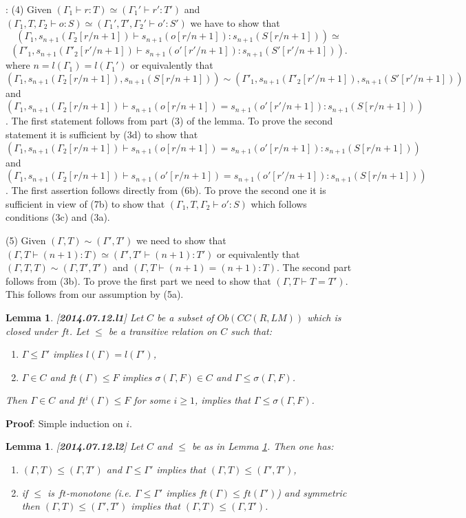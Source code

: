 \documentclass[11pt]{article}
\newenvironment{proof}{{\bf Proof}:}{\vskip 5mm }
\newtheorem{lemma}[proposition]{Lemma}
\newcommand{\llabel}[1]{\label{#1}[{\bf #1}]}
\begin{document}
\begin{proof}
(4) Given $(\Gamma_1\vdash r:T)\simeq(\Gamma_1'\vdash r':T')$ and $(\Gamma_1,T,\Gamma_2\vdash o:S)\simeq(\Gamma_1',T',\Gamma_2'\vdash o':S')$ we have to show that 
%
$$(\Gamma_1,s_{n+1}(\Gamma_2[r/n+1])\vdash s_{n+1}(o[r/n+1]):s_{n+1}(S[r/n+1]))\simeq$$ 
$$ (\Gamma'_1,s_{n+1}(\Gamma'_2[r'/n+1])\vdash s_{n+1}(o'[r'/n+1]):s_{n+1}(S'[r'/n+1])).$$
%
%
where $n=l(\Gamma_1)=l(\Gamma_1')$ or equivalently that 
%
$$(\Gamma_1,s_{n+1}(\Gamma_2[r/n+1]),s_{n+1}(S[r/n+1]))\sim(\Gamma'_1,s_{n+1}(\Gamma'_2[r'/n+1]), s_{n+1}(S'[r'/n+1]))$$
%
and $(\Gamma_1,s_{n+1}(\Gamma_2[r/n+1])\vdash s_{n+1}(o[r/n+1])=s_{n+1}(o'[r'/n+1]):s_{n+1}(S[r/n+1]))$. The first statement follows from part (3) of the lemma. To prove the second statement it is sufficient by (3d) to show that  $(\Gamma_1,s_{n+1}(\Gamma_2[r/n+1])\vdash s_{n+1}(o[r/n+1])=s_{n+1}(o'[r/n+1]):s_{n+1}(S[r/n+1]))$ and  $(\Gamma_1,s_{n+1}(\Gamma_2[r/n+1])\vdash s_{n+1}(o'[r/n+1])=s_{n+1}(o'[r'/n+1]):s_{n+1}(S[r/n+1]))$. The first assertion follows directly from (6b). To prove the second one it is sufficient in view of (7b) to show that $(\Gamma_1,T,\Gamma_2\vdash o':S)$ which follows conditions (3c) and (3a).

(5) Given $(\Gamma,T)\sim(\Gamma',T')$ we need to show that $(\Gamma,T\vdash (n+1):T)\simeq(\Gamma',T'\vdash (n+1):T')$ or equivalently that $(\Gamma,T,T)\sim(\Gamma,T',T')$ and $(\Gamma,T\vdash (n+1)=(n+1):T)$. The second part follows from (3b). To prove the first part we need to show that $(\Gamma,T\vdash T=T')$. This follows from our assumption by (5a). 
\end{proof}
%
\begin{lemma}
\llabel{2014.07.12.l1}
Let $C$ be a subset of $Ob(CC(R,LM))$ which is closed under $ft$. Let $\le$ be a transitive relation on $C$ such that:
%
\begin{enumerate}
\item $\Gamma\le \Gamma'$ implies $l(\Gamma)=l(\Gamma')$,
\item $\Gamma\in C$ and $ft(\Gamma)\le F$ implies $\sigma(\Gamma,F)\in C$ and $\Gamma\le \sigma(\Gamma,F)$.
\end{enumerate}
%
Then $\Gamma\in C$ and $ft^i(\Gamma)\le F$ for some $i\ge 1$, implies that $\Gamma\le \sigma(\Gamma,F)$. 
\end{lemma}
%
\begin{proof}
Simple induction on $i$.
\end{proof}
%
\begin{lemma}
\llabel{2014.07.12.l2}
Let $C$ and $\le$ be as in Lemma \ref{2014.07.12.l1}. Then one has:
%
\begin{enumerate}
\item $(\Gamma,T)\le (\Gamma,T')$ and $\Gamma\le \Gamma'$ implies that $(\Gamma,T)\le (\Gamma',T')$,
\item if $\le$ is $ft$-monotone (i.e. $\Gamma\le \Gamma'$ implies $ft(\Gamma)\le ft(\Gamma')$) and symmetric then $(\Gamma,T)\le (\Gamma',T')$ implies that $(\Gamma,T)\le (\Gamma,T')$.
\end{enumerate}
\end{lemma}
\end{document}
